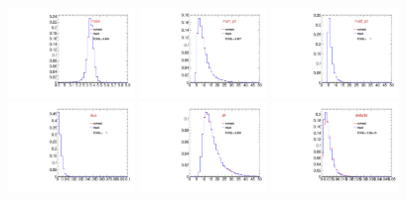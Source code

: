 \begin{figure}
  \includegraphics[width=0.3\textwidth]{Figures/VariablesComparison/MC_barrel_figs/m}
  \includegraphics[width=0.3\textwidth]{Figures/VariablesComparison/MC_barrel_figs/m1pt}
  \includegraphics[width=0.3\textwidth]{Figures/VariablesComparison/MC_barrel_figs/m2pt}
  \includegraphics[width=0.3\textwidth]{Figures/VariablesComparison/MC_barrel_figs/maxdoca}
  \includegraphics[width=0.3\textwidth]{Figures/VariablesComparison/MC_barrel_figs/pt}
  \includegraphics[width=0.3\textwidth]{Figures/VariablesComparison/MC_barrel_figs/pvip}

\end{figure}
